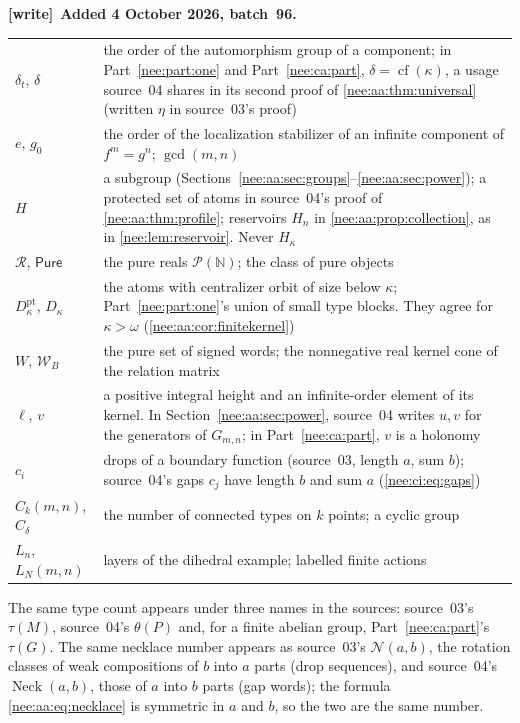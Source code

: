 \documentclass[11pt,letterpaper]{article}
\numberwithin{equation}{section}
\theoremstyle{plain}
\theoremstyle{definition}
\theoremstyle{remark}
\newcommand{\cf}{\operatorname{cf}}
\newcommand{\NN}{\mathbb N}
\newcommand{\Pure}{\mathsf{Pure}}
\newcommand{\Neck}{\operatorname{Neck}}
\newenvironment{writenote}[1][]{\par\smallskip\begingroup\small\raggedright
 \setlength{\parindent}{1.25em}\noindent\textbf{[write]}\if\relax\detokenize{#1}\relax\else~\textbf{#1.}\fi\ }%
 {\par\endgroup\smallskip}
\begin{document}
\begin{writenote}[Added 4 October 2026, batch~96]
\begin{center}
\begin{tabular}{>{\raggedright\arraybackslash}p{}>{\raggedright\arraybackslash}p{}}
$\delta_t$, $\delta$ & the order of the automorphism group of a component; in Part~\ref{nee:part:one} and Part~\ref{nee:ca:part}, $\delta=\cf(\kappa)$, a usage source~04 shares in its second proof of \cref{nee:aa:thm:universal} (written $\eta$ in source~03's proof)\\
$e$, $g_0$ & the order of the localization stabilizer of an infinite component of $f^m=g^n$; $\gcd(m,n)$\\
$H$ & a subgroup (Sections~\ref{nee:aa:sec:groups}--\ref{nee:aa:sec:power}); a protected set of atoms in source~04's proof of \cref{nee:aa:thm:profile}; reservoirs $H_n$ in \cref{nee:aa:prop:collection}, as in \cref{nee:lem:reservoir}. Never $H_\kappa$\\
$\mathscr R$, $\Pure$ & the pure reals $\mathcal P(\NN)$; the class of pure objects\\
$D^{\mathrm{pt}}_\kappa$, $D_\kappa$ & the atoms with centralizer orbit of size below $\kappa$; Part~\ref{nee:part:one}'s union of small type blocks. They agree for $\kappa>\omega$ (\cref{nee:aa:cor:finitekernel})\\
$W$, $\mathcal W_B$ & the pure set of signed words; the nonnegative real kernel cone of the relation matrix\\
$\ell$, $v$ & a positive integral height and an infinite-order element of its kernel. In Section~\ref{nee:aa:sec:power}, source~04 writes $u,v$ for the generators of $G_{m,n}$; in Part~\ref{nee:ca:part}, $v$ is a holonomy\\
$c_i$ & drops of a boundary function (source~03, length $a$, sum $b$); source~04's gaps $c_j$ have length $b$ and sum $a$ (\eqref{nee:ci:eq:gaps})\\
$C_k(m,n)$, $C_\delta$ & the number of connected types on $k$ points; a cyclic group\\
$L_n$, $L_N(m,n)$ & layers of the dihedral example; labelled finite actions\\
\bottomrule
\end{tabular}
\end{center}
The same type count appears under three names in the sources: source~03's $\tau(M)$, source~04's $\theta(P)$ and, for a finite abelian group, Part~\ref{nee:ca:part}'s $\tau(G)$. The same necklace number appears as source~03's $\mathcal N(a,b)$, the rotation classes of weak compositions of $b$ into $a$ parts (drop sequences), and source~04's $\Neck(a,b)$, those of $a$ into $b$ parts (gap words); the formula \eqref{nee:aa:eq:necklace} is symmetric in $a$ and $b$, so the two are the same number.
\end{writenote}
\end{document}
